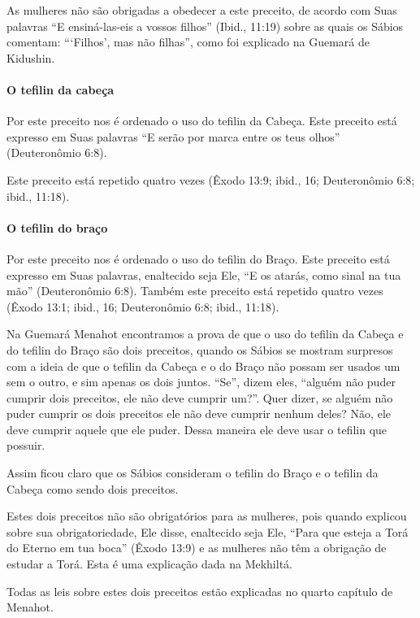 As mulheres não são obrigadas a obedecer a este preceito, de acordo com
Suas palavras ``E ensiná-las-eis a vossos filhos'' (Ibid., 11:19) sobre
as quais os Sábios comentam: ```Filhos', mas não filhas'', como foi
explicado na Guemará de Kidushin.

\paragraph{O tefilin da cabeça}

Por este preceito nos é ordenado o uso do tefilin da Cabeça. Este
preceito está expresso em Suas palavras ``E serão por marca entre os
teus olhos'' (Deuteronômio 6:8).

Este preceito está repetido quatro vezes (Êxodo 13:9; ibid., 16;
Deuteronômio 6:8; ibid., 11:18).

\paragraph{O tefilin do braço}

Por este preceito nos é ordenado o uso do tefilin do Braço. Este
preceito está expresso em Suas palavras, enaltecido seja Ele, ``E os
atarás, como sinal na tua mão'' (Deuteronômio 6:8). Também este preceito
está repetido quatro vezes (Êxodo 13:1; ibid., 16; Deuteronômio 6:8;
ibid., 11:18).

Na Guemará Menahot encontramos a prova de que o uso do tefilin da
Cabeça e do tefilin do Braço são dois preceitos, quando os Sábios se
mostram surpresos com a ideia de que o tefilin da Cabeça e o do
Braço não possam ser usados um sem o outro, e sim apenas os dois juntos.
``Se'', dizem eles, ``alguém não puder cumprir dois preceitos, ele não
deve cumprir um?''. Quer dizer, se alguém não puder cumprir os dois
preceitos ele não deve cumprir nenhum deles? Não, ele deve cumprir
aquele que ele puder. Dessa maneira ele deve usar o tefilin que
possuir.

Assim ficou claro que os Sábios consideram o tefilin do Braço e o
tefilin da Cabeça como sendo dois preceitos.

Estes dois preceitos não são obrigatórios para as mulheres, pois quando
explicou sobre sua obrigatoriedade, Ele disse, enaltecido seja Ele,
``Para que esteja a Torá do Eterno em tua boca'' (Êxodo 13:9) e as
mulheres não têm a obrigação de estudar a Torá. Esta é uma explicação
dada na Mekhiltá.

Todas as leis sobre estes dois preceitos estão explicadas no quarto
capítulo de Menahot.

